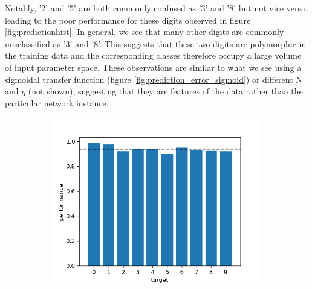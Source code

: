 \documentclass{article}
\begin{document}
\newpage

Notably, '2' and '5' are both commonly confused as '3' and '8' but not vice versa, leading to the poor performance for these digits observed in figure \ref{fig:predictionhist}. In general, we see that many other digits are commonly misclassified as '3' and '8'. This suggests that these two digits are polymorphic in the training data and the corresponding classes therefore occupy a large volume of input parameter space.
These observations are similar to what we see using a sigmoidal transfer function (figure \ref{fig:prediction_error_sigmoid}) or different N and $\eta$ (not shown), suggesting that they are features of the data rather than the particular network instance.

\begin{figure}[h]
	\centering
	\begin{subfigure}[t]{0.48\linewidth}
		\centering
		\includegraphics[width = 1.0\linewidth, trim={0 0 0 0}, clip=true]{figures/predictionhist_sigmoid.png}
		\subcaption{}
		\label{fig:predictionhist_sigmoid}	
	\end{subfigure}%
	\hspace{0.02 \linewidth}
	\begin{subfigure}[t]{0.42\linewidth}
		\centering

\end{subfigure}
\end{figure}
\end{document}
